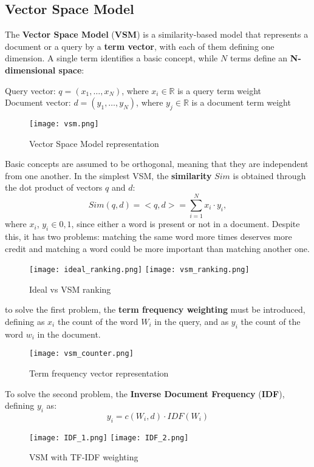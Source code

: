 \documentclass{article}
\begin{document}
\subsection{Vector Space Model}
The \textbf{Vector Space Model} (\textbf{VSM}) is a similarity-based model that represents a document or a query by a \textbf{term vector}, with each of them defining one dimension.
A single term identifies a basic concept, while $N$ terms define an \textbf{N-dimensional space}:
\begin{center}
    Query vector: $q = (x_1, \dots, x_N)$, where $x_i \in \mathbb{R}$ is a query term weight \\
    Document vector: $d = (y_1, \dots, y_N)$, where $y_j \in \mathbb{R}$ is a document term weight
\end{center}
\begin{figure}[H]
    \centering
    \texttt{[image: vsm.png]}
    \caption{Vector Space Model representation}
\end{figure}
Basic concepts are assumed to be orthogonal, meaning that they are independent from one another.
In the simplest VSM, the \textbf{similarity} $Sim$ is obtained through the dot product of vectors $q$ and $d$:
\[
    Sim(q,d) = <q,d> = \sum_{i = 1}^N x_i \cdot y_i,
\]
where $x_i$, $y_i \in {0, 1}$, since either a word is present or not in a document.  
Despite this, it has two problems: matching the same word more times deserves more credit and matching a word could be more important than matching another one.
\begin{figure}[H]
    \centering
    \texttt{[image: ideal\_ranking.png]}
    \texttt{[image: vsm\_ranking.png]}
    \caption{Ideal vs VSM ranking}
\end{figure}
to solve the first problem, the \textbf{term frequency weighting} must be introduced, defining as $x_i$ the count of the word $W_i$ in the query, and as $y_i$ the count of the word $w_i$ in the document.
\begin{figure}[H]
    \centering
    \texttt{[image: vsm\_counter.png]}
    \caption{Term frequency vector representation}
\end{figure}
To solve the second problem, the \textbf{Inverse Document Frequency} (\textbf{IDF}), defining $y_i$ as:
\[
    y_i = c(W_i, d) \cdot IDF(W_i)
\]
\begin{figure}[H]
    \centering
    \texttt{[image: IDF\_1.png]}
    \texttt{[image: IDF\_2.png]}
    \caption{VSM with TF-IDF weighting}
\end{figure}
\end{document}

